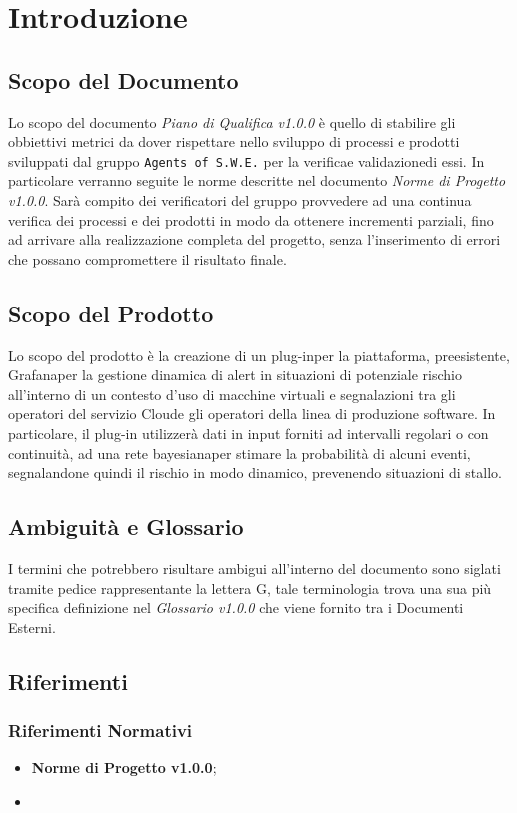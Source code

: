 \section{Introduzione}
\label{introduzione}

\subsection{Scopo del Documento}

Lo scopo del documento \textit{Piano di Qualifica v1.0.0} è quello di stabilire gli obbiettivi metrici da dover rispettare nello sviluppo di processi e prodotti sviluppati dal gruppo \texttt{Agents of S.W.E.} per la verifica\glossario e validazione\glossario di essi. In particolare verranno seguite le norme descritte nel documento \textit{Norme di Progetto v1.0.0}. Sarà compito dei verificatori del gruppo provvedere ad una continua verifica dei processi e dei prodotti in modo da ottenere incrementi parziali, fino ad arrivare alla realizzazione completa del progetto, senza l'inserimento di errori che possano compromettere il risultato finale. 

\subsection{Scopo del Prodotto}
Lo scopo del prodotto è la creazione di un plug-in\glossario  per la piattaforma, preesistente, Grafana\glossario per la gestione dinamica di alert in situazioni di potenziale rischio all’interno di un contesto d’uso di macchine virtuali e segnalazioni tra gli operatori del servizio Cloud\glossario e gli operatori della linea di produzione software. In particolare, il plug-in utilizzerà dati in input forniti ad intervalli regolari o con continuità, ad una rete bayesiana\glossario per stimare la probabilità di alcuni eventi, segnalandone quindi il rischio in modo dinamico, prevenendo situazioni di stallo.   

\subsection{Ambiguità e Glossario}
I termini che potrebbero risultare ambigui all'interno del documento sono siglati tramite pedice rappresentante la lettera \textmd{G}, tale terminologia trova una sua più specifica definizione nel \textit{Glossario v1.0.0} che viene fornito tra i Documenti Esterni.

\subsection{Riferimenti}
\subsubsection{Riferimenti Normativi}

	\begin{itemize}
		\item \textbf{Norme di Progetto v1.0.0};
		\item 
	\end{itemize}


